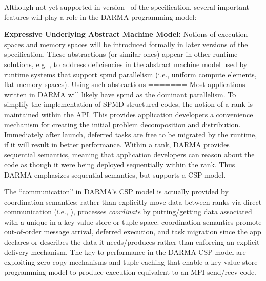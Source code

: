 Although not yet supported in version \specVersion\ of the specification, several
important features will play a role in the \gls{DARMA} \gls{programming model}:
\begin{compactdesc}
\item{\bf Expressive Underlying Abstract Machine Model:}
Notions of \glspl{execution space} and \glspl{memory space} will be introduced
formally in later
versions of the specification.  These abstractions (or similar ones) appear in other runtime
solutions, e.g. \cite{Kokkos}, to
  address deficiencies in the \gls{abstract machine model} used by 
  \glspl{runtime system} that support \gls{spmd} parallelism (i.e., uniform compute elements, flat memory
    spaces).  Using such abstractions
=======
Most applications written in DARMA will likely have \gls{spmd} as the dominant parallelism.
To simplify the implementation of SPMD-structured codes, the notion of a \gls{rank} is maintained within the \gls{API}.   
This provides application developers a convenience mechanism for creating
the initial problem decomposition and distribution.  
Immediately after launch, deferred tasks are free to be migrated by the runtime, if it will result in better performance. 
Within a \gls{rank}, DARMA provides \gls{sequential semantics},  meaning that application developers can reason about the code as
though it were being deployed sequentially within the rank.   
Thus DARMA emphasizes sequential semantics, but supports a CSP model.


The ``communication'' in DARMA's CSP model is actually provided by \gls{coordination semantics}:  
rather than explicitly move data between ranks via direct communication
(i.e.,  ), processes \emph{coordinate} by putting/getting data associated with a unique  in a
\gls{key-value store} or \gls{tuple space}.  
\Gls{coordination semantics} promote out-of-order message arrival, deferred execution, and task migration
since the app declares or describes the data it needs/produces rather than enforcing an explicit delivery mechanism.
The key to performance in the DARMA CSP model are exploiting zero-copy mechanisms and tuple caching that enable a key-value store programming model
to produce execution equivalent to an MPI send/recv code. 


\end{compactdesc}
